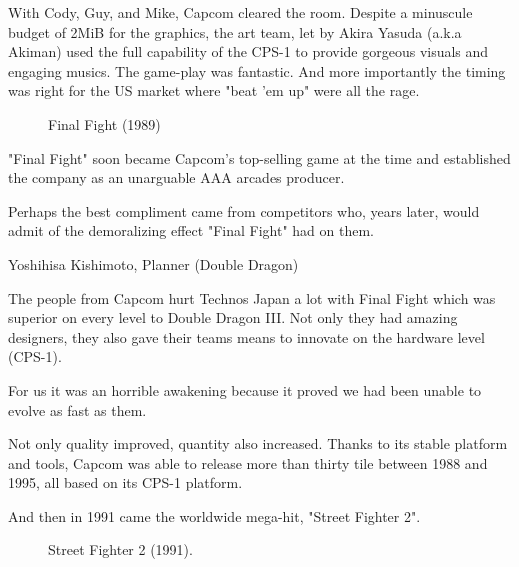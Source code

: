 With Cody, Guy, and Mike, Capcom cleared the room. Despite a minuscule budget of 2MiB for the graphics, the art team, let by Akira Yasuda (a.k.a Akiman) used the full capability of the CPS-1 to provide gorgeous visuals and engaging musics. The game-play was fantastic. And more importantly the timing was right for the US market where "beat 'em up" were all the rage.



  

\label{nin_ff}
 \begin{figure}[H]
\caption*{Final Fight (1989)}
\end{figure}

"Final Fight" soon became Capcom's top-selling game at the time\cite{birth_of_chunli} and established the company as an unarguable AAA arcades producer.

\pagebreak

Perhaps the best compliment came from competitors who, years later, would admit of the demoralizing effect "Final Fight" had on them.

\begin{q}{Yoshihisa Kishimoto, Planner\cite{dd} (Double Dragon)}
  

  The people from Capcom hurt Technos Japan a lot with Final Fight which was superior on every level to Double Dragon III. Not only they had amazing designers, they also gave their teams means to innovate on the hardware level (CPS-1). 

  For us it was an horrible awakening because it proved we had been unable to evolve as fast as them.
  \end{q}



Not only quality improved, quantity also increased. Thanks to its stable platform and tools, Capcom was able to release more than thirty tile between 1988 and 1995, all based on its CPS-1 platform. 

And then in 1991 came the worldwide mega-hit, "Street Fighter 2".

\label{nin_sf2}
\begin{figure}[H]
\caption*{Street Fighter 2 (1991).}
\end{figure}

